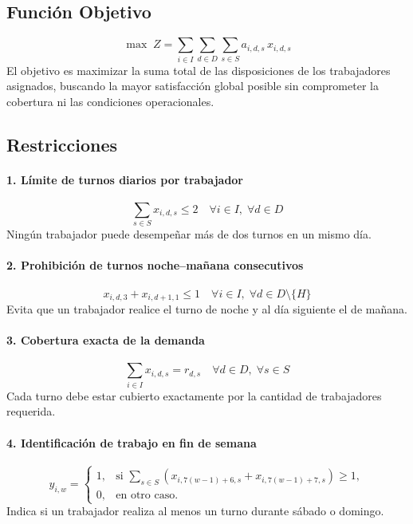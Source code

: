 \documentclass[a4paper,12pt]{article}
\begin{document}
	\subsection*{Función Objetivo}
	\[
	\max \; Z = \sum_{i \in I} \sum_{d \in D} \sum_{s \in S} a_{i,d,s} \, x_{i,d,s}
	\]
	\noindent
	El objetivo es maximizar la suma total de las disposiciones de los trabajadores asignados, buscando la mayor satisfacción global posible sin comprometer la cobertura ni las condiciones operacionales.
	
	\subsection*{Restricciones}
	
	\paragraph{1. Límite de turnos diarios por trabajador}
	\[
	\sum_{s \in S} x_{i,d,s} \le 2 \quad \forall i \in I, \; \forall d \in D
	\]
	Ningún trabajador puede desempeñar más de dos turnos en un mismo día.
	
	\paragraph{2. Prohibición de turnos noche–mañana consecutivos}
	\[
	x_{i,d,3} + x_{i,d+1,1} \le 1 \quad \forall i \in I, \; \forall d \in D \setminus \{H\}
	\]
	Evita que un trabajador realice el turno de noche y al día siguiente el de mañana.
	
	\paragraph{3. Cobertura exacta de la demanda}
	\[
	\sum_{i \in I} x_{i,d,s} = r_{d,s} \quad \forall d \in D, \; \forall s \in S
	\]
	Cada turno debe estar cubierto exactamente por la cantidad de trabajadores requerida.
	
	\paragraph{4. Identificación de trabajo en fin de semana}
	\[
	y_{i,w} = 
	\begin{cases}
		1, & \text{si } \displaystyle \sum_{s \in S} (x_{i,7(w-1)+6,s} + x_{i,7(w-1)+7,s}) \ge 1, \\
		0, & \text{en otro caso.}
	\end{cases}
	\]
	Indica si un trabajador realiza al menos un turno durante sábado o domingo.
	
\end{document}
